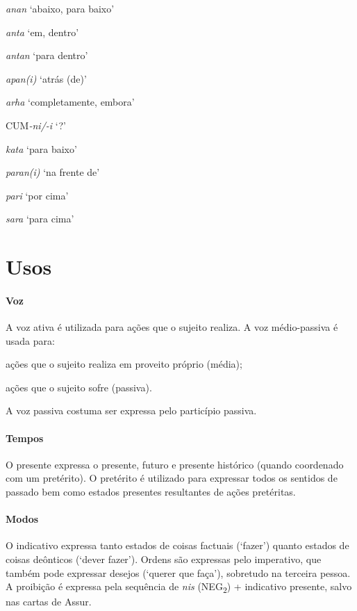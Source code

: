 \begin{multicols}{2}
	\begin{compactenum}[(a)]
		\item *\emph{anan} `abaixo, para baixo'
		\item \emph{anta} `em, dentro'
		\item \emph{antan} `para dentro'
		\item \emph{apan{(i)}} `atrás (de)'
		\item \emph{arha} `completamente, embora'
		\item CUM\emph{-ni/-i} `?'
		\item *\emph{kata} `para baixo'
		\item \emph{paran{(i)}} `na frente de'
		\item \emph{pari} `por cima'
		\item \emph{sara} `para cima'
	\end{compactenum}
\end{multicols}

\section{Usos}

\paragraph{Voz}
A voz ativa é utilizada para ações que o sujeito realiza.
A voz médio-passiva é usada para:
\begin{inparaenum}[(a)]
	\item ações que o sujeito realiza em proveito próprio (média);
	\item ações que o sujeito sofre (passiva).
\end{inparaenum}
A voz passiva costuma ser expressa pelo particípio passiva.


\paragraph{Tempos}
O presente expressa o presente, futuro e presente histórico (quando coordenado
com um pretérito).
O pretérito é utilizado para expressar todos os sentidos de passado bem como
estados presentes resultantes de ações pretéritas.


\paragraph{Modos}
O indicativo expressa tanto estados de coisas factuais (`fazer') quan\-to estados de coisas
deônticos (`dever fazer').
Ordens são expressas pelo imperativo, que também pode expressar desejos (`querer
que faça'), sobretudo na terceira pessoa.
A proibição é expressa pela sequência de \emph{nis} (NEG\textsubscript{2}) +
indicativo presente, salvo nas cartas de Assur.

